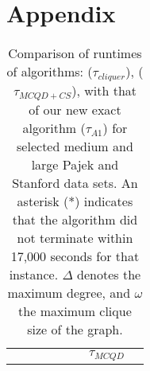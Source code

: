 \section*{Appendix}
\label{sec:appendix}

\begin{table}[!hbt]
\centering
\caption{Comparison of runtimes of algorithms: \cite{ostergard} ({\it $\tau_{cliquer}$}), \cite{konc2007improved} ({\it $\tau_{MCQD+CS}$}), 
with that of our new exact algorithm ($\tau_{A1}$) for selected medium and large Pajek and Stanford data sets. 
An asterisk (*) indicates that the algorithm did not terminate within 
17,000 seconds for that instance. $\Delta$ denotes the maximum degree, and $\omega$ the maximum clique size of the graph.}
\label{tab:pajek_stanford}
\begin{tabular}{lrrrr|rrr}
\toprule\toprule
	&		&		&		&		&		&	$\tau_{MCQD}$	&		\\

\end{tabular}
\end{table}
